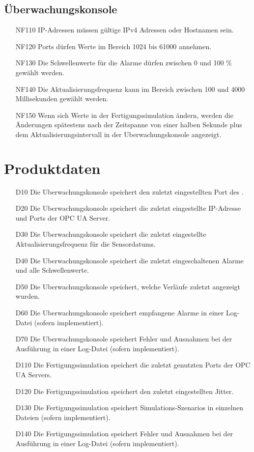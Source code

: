 \documentclass[parskip=full]{scrartcl}
\begin{document}
\subsection{Überwachungskonsole}
\begin{enumerate}
  \item[NF110] IP-Adressen müssen gültige IPv4 Adressen oder Hostnamen sein. %
  \item[NF120] Ports dürfen Werte im Bereich 1024 bis 61000 annehmen.
  \item[NF130] Die Schwellenwerte für die Alarme dürfen zwischen 0 und 100 \% gewählt werden.
  \item[NF140] Die Aktualisierungsfrequenz kann im Bereich zwischen 100 und 4000 Millisekunden gewählt werden.
  \item[NF150] Wenn sich Werte in der \gls{Fertigungssimulation} ändern, werden die Änderungen spätestens nach der Zeitspanne von
    einer halben Sekunde plus dem Aktualisierungsintervall in der \gls{Uberwachungskonsole} angezeigt.
\end{enumerate}

\pagebreak
\section{Produktdaten}
\begin{enumerate}
  \item[D10] Die \gls{Uberwachungskonsole} speichert den zuletzt eingestellten Port des .
  \item[D20] Die \gls{Uberwachungskonsole} speichert die zuletzt eingestellte IP-Adresse und Ports der \gls{OPC UA Server}.
  \item[D30] Die \gls{Uberwachungskonsole} speichert die zuletzt eingestellte Aktualisierungsfrequenz für die \glspl{Sensordatum}.
  \item[D40] Die \gls{Uberwachungskonsole} speichert die zuletzt eingeschaltenen Alarme und alle Schwellenwerte.
  \item[D50] Die \gls{Uberwachungskonsole} speichert, welche Verläufe zuletzt angezeigt wurden.
  \item[D60] Die \gls{Uberwachungskonsole} speichert empfangene Alarme in einer Log-Datei (sofern implementiert).
  \item[D70] Die \gls{Uberwachungskonsole} speichert Fehler und Ausnahmen bei der Ausführung in einer Log-Datei (sofern implementiert).
  \item[D110] Die \gls{Fertigungssimulation} speichert die zuletzt genutzten Ports der \glspl{OPC UA Server}.
  \item[D120] Die \gls{Fertigungssimulation} speichert den zuletzt eingestellten \gls{Jitter}.
  \item[D130] Die \gls{Fertigungssimulation} speichert \glspl{Simulations-Szenario} in einzelnen Dateien (sofern implementiert).
  \item[D140] Die \gls{Fertigungssimulation} speichert Fehler und Ausnahmen bei der Ausführung in einer Log-Datei (sofern implementiert).
\end{enumerate}
\end{document}
